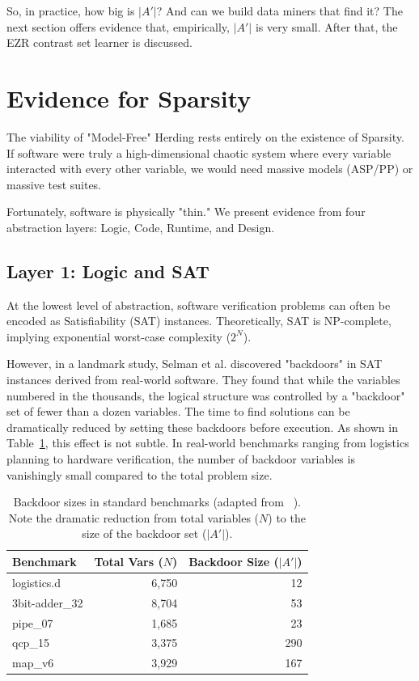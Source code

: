 \documentclass[runningheads]{llncs}
\begin{document}
So,  in practice, how big is $|A'|$?
And can we build data miners that find it?
The next section offers evidence that, empirically,  $|A'|$ is very small.
After that, the EZR contrast set learner is discussed.



\section{Evidence for Sparsity}
The viability of "Model-Free" Herding rests entirely on the existence of 
Sparsity. If software were truly a high-dimensional chaotic system where 
every variable interacted with every other variable, we would need massive 
models (ASP/PP) or massive test suites.

Fortunately, software is physically "thin." We present evidence from four 
abstraction layers: Logic, Code, Runtime, and Design.

\subsection{Layer 1: Logic and SAT}
At the lowest level of abstraction, software verification problems can often be
encoded as Satisfiability (SAT) instances. Theoretically, SAT is NP-complete, 
implying exponential worst-case complexity ($2^N$).

 However, in a landmark study, Selman et al. \cite{Selman03} discovered 
"backdoors" in SAT instances derived from real-world software. They found 
that while the variables numbered in the thousands, the logical structure was 
controlled by a "backdoor" set of fewer than a dozen variables.  The time to find
solutions can be dramatically reduced by
setting these backdoors before execution.
As shown in Table~\ref{tab:selman}, this effect is not subtle. In
real-world benchmarks ranging from logistics planning to hardware
verification, the number of backdoor variables is vanishingly small
compared to the total problem size.
\begin{table}[!h]
\centering
\footnotesize
\caption{Backdoor sizes in standard benchmarks (adapted from
~\cite{Selman03}). Note the dramatic reduction from total variables
($N$) to the size of the backdoor set ($|A'|$).}
\label{tab:selman}
\begin{tabular}{l|r|r}
\textbf{Benchmark} & \textbf{Total Vars ($N$)} & \textbf{Backdoor Size
($|A'|$)} \\
\midrule
logistics.d     & 6,750  & 12 \\
3bit-adder\_32  & 8,704  & 53 \\
pipe\_07        & 1,685  & 23 \\
qcp\_15         & 3,375  & 290 \\
map\_v6         & 3,929  & 167
\end{tabular}
\end{table}
\end{document}
